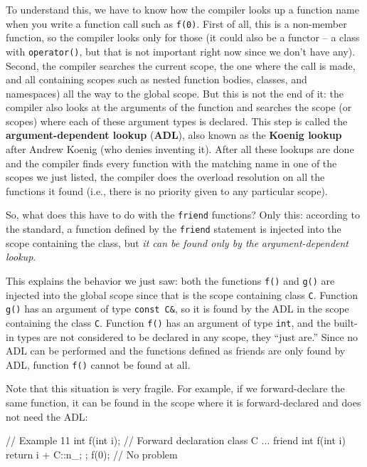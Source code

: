 To understand this, we have to know how the compiler looks up a function name when you write a function call such as \texttt{f(0)}. First of all, this is a non-member function, so the compiler looks only for those (it could also be a functor -- a class with \texttt{operator()}, but that is not important right now since we don't have any). Second, the compiler searches the current scope, the one where the call is made, and all containing scopes such as nested function bodies, classes, and namespaces) all the way to the global scope. But this is not the end of it: the compiler also looks at the arguments of the function and searches the scope (or scopes) where each of these argument types is declared. This step is called the \textbf{argument-dependent lookup} (\textbf{ADL}), also known as the \textbf{Koenig lookup} after Andrew Koenig (who denies inventing it). After all these lookups are done and the compiler finds every function with the matching name in one of the scopes we just listed, the compiler does the overload resolution on all the functions it found (i.e., there is no priority given to any particular scope).

So, what does this have to do with the \texttt{friend} functions? Only this: according to the standard, a function defined by the \texttt{friend} statement is injected into the scope containing the class, but \emph{it can be found only by the} \emph{argument-dependent lookup}.

This explains the behavior we just saw: both the functions \texttt{f()} and \texttt{g()} are injected into the global scope since that is the scope containing class \texttt{C}. Function \texttt{g()} has an argument of type \texttt{const\ C\&}, so it is found by the ADL in the scope containing the class \texttt{C}. Function \texttt{f()} has an argument of type \texttt{int}, and the built-in types are not considered to be declared in any scope, they ``just are.'' Since no ADL can be performed and the functions defined as friends are only found by ADL, function \texttt{f()} cannot be found at all.

Note that this situation is very fragile. For example, if we forward-declare the same function, it can be found in the scope where it is forward-declared and does not need the ADL:

\begin{code}
// Example 11
int f(int i);    // Forward declaration
class C {
  ...
  friend int f(int i) { return i + C::n_; }
};
f(0);        // No problem
\end{code}

